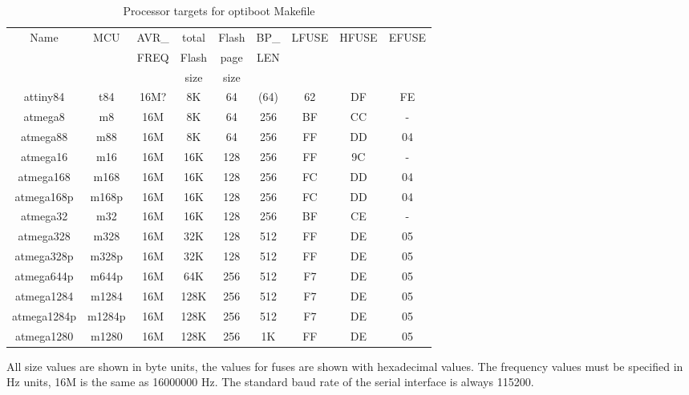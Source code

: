 \begin{table}[H]
  \begin{center}
    \begin{tabular}{| c | c | c | c | c | c | c | c | c |}
    \hline
             Name  & MCU & AVR\_ & total & Flash & BP\_ & LFUSE & HFUSE & EFUSE  \\
                   &     & FREQ  & Flash & page  & LEN  &       &       &        \\
                   &     &       &  size & size  &      &       &       &        \\
    \hline
    \hline
         attiny84 & t84   & 16M? &  8K   &  64   & (64) &  62   &  DF   & FE \\
    \hline
         atmega8  & m8    & 16M  &  8K   &  64   & 256  &  BF   &  CC   &  - \\
    \hline
         atmega88 & m88   & 16M  &  8K   &  64   & 256  &  FF   &  DD   &  04 \\
    \hline
       atmega16   & m16   & 16M  &  16K  & 128   & 256  &  FF   &  9C   &  - \\
    \hline
       atmega168  &  m168  & 16M  &  16K & 128   & 256  &  FC   &  DD   &  04 \\
       atmega168p &  m168p & 16M  &  16K & 128   & 256  &  FC   &  DD   &  04 \\
    \hline
       atmega32   &  m32   & 16M  &  16K & 128   & 256  &  BF   &  CE   &  - \\
    \hline
       atmega328  &  m328  & 16M  &  32K & 128   & 512  &  FF   &  DE   &  05 \\
       atmega328p & m328p & 16M  &  32K  & 128   & 512  &  FF   &  DE   &  05 \\
    \hline
       atmega644p & m644p & 16M  &  64K  & 256   & 512  &  F7   &  DE   &  05 \\
    \hline
     atmega1284  & m1284  & 16M  & 128K  & 256   & 512  &  F7   &  DE   &  05 \\
     atmega1284p & m1284p & 16M  & 128K  & 256   & 512  &  F7   &  DE   &  05 \\
    \hline
     atmega1280  & m1280  & 16M  &  128K & 256   & 1K   &  FF   &  DE   &  05 \\
    \hline
    \end{tabular}
  \end{center}
  \caption{Processor targets for optiboot Makefile}
  \label{tab:processors}
\end{table}

All size values are shown in byte units, the values for fuses are shown with hexadecimal values.
The frequency values must be specified in Hz units, 16M is the same as 16000000 Hz.
The standard baud rate of the serial interface is always 115200.

